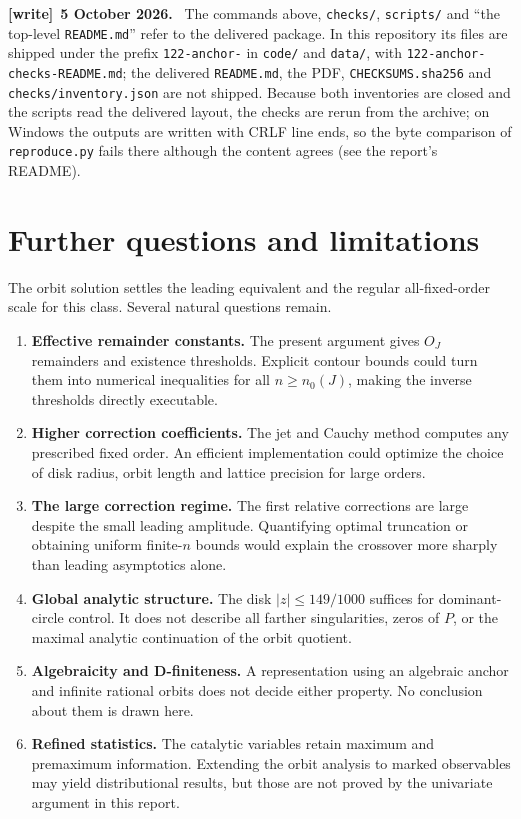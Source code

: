 \documentclass[11pt,letterpaper]{article}
\theoremstyle{remark}\newtheorem{remark}[theorem]{Remark}
\newcommand{\file}[1]{\nolinkurl{#1}}
\newenvironment{writenote}[1][]{\par\smallskip\begingroup\small
 \noindent\textbf{[write]}\if\relax\detokenize{#1}\relax\else~\textbf{#1.}\fi\ }%
 {\par\endgroup\smallskip}
\begin{document}
\begin{writenote}[5 October 2026]
The commands above, \file{checks/}, \file{scripts/} and ``the top-level \file{README.md}'' refer to the delivered package. In this repository its files are shipped under the prefix \file{122-anchor-} in \file{code/} and \file{data/}, with \file{122-anchor-checks-README.md}; the delivered \file{README.md}, the PDF, \file{CHECKSUMS.sha256} and \file{checks/inventory.json} are not shipped. Because both inventories are closed and the scripts read the delivered layout, the checks are rerun from the archive; on Windows the outputs are written with CRLF line ends, so the byte comparison of \file{reproduce.py} fails there although the content agrees (see the report's README).
\end{writenote}
\section{Further questions and limitations}\label{ivk:anc:sec:questions}
The orbit solution settles the leading equivalent and the regular
all-fixed-order scale for this class. Several natural questions
remain.
\begin{enumerate}
 \item \textbf{Effective remainder constants.} The present argument
 gives $O_J$ remainders and existence thresholds. Explicit contour
 bounds could turn them into numerical inequalities for all
 $n\ge n_0(J)$, making the inverse thresholds directly executable.
 \item \textbf{Higher correction coefficients.} The jet and Cauchy
 method computes any prescribed fixed order. An efficient
 implementation could optimize the choice of disk radius, orbit
 length and lattice precision for large orders.
 \item \textbf{The large correction regime.} The first relative
 corrections are large despite the small leading amplitude.
 Quantifying optimal truncation or obtaining uniform finite-$n$
 bounds would explain the crossover more sharply than leading
 asymptotics alone.
 \item \textbf{Global analytic structure.} The disk $|z|\le149/1000$
 suffices for dominant-circle control. It does not describe all
 farther singularities, zeros of $P$, or the maximal analytic
 continuation of the orbit quotient.
 \item \textbf{Algebraicity and D-finiteness.} A representation using
 an algebraic anchor and infinite rational orbits does not decide
 either property. No conclusion about them is drawn here.
 \item \textbf{Refined statistics.} The catalytic variables retain
 maximum and premaximum information. Extending the orbit analysis
 to marked observables may yield distributional results, but those
 are not proved by the univariate argument in this report.
\end{enumerate}
\end{document}
